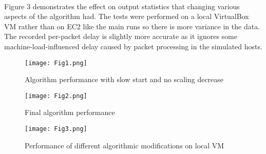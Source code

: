 \documentclass[12pt]{article}
\begin{document}
\\
Figure 3 demonstrates the effect on output statistics that changing various aspects of the algorithm had. The tests were performed on a local VirtualBox VM rather than on EC2 like the main runs so there is more variance in the data. The recorded per-packet delay is slightly more accurate as it ignores some machine-load-influenced delay caused by packet processing in the simulated hosts.


\begin{figure}[h!]
  \texttt{[image: Fig1.png]}
  \caption{Algorithm performance with slow start and no scaling decrease}
\end{figure}

\begin{figure}[h!]
  \texttt{[image: Fig2.png]}
  \caption{Final algorithm performance}
\end{figure}

\begin{figure}[h!]
  \texttt{[image: Fig3.png]}
  \caption{Performance of different algorithmic modifications on local VM}
\end{figure}

		
\end{document}
